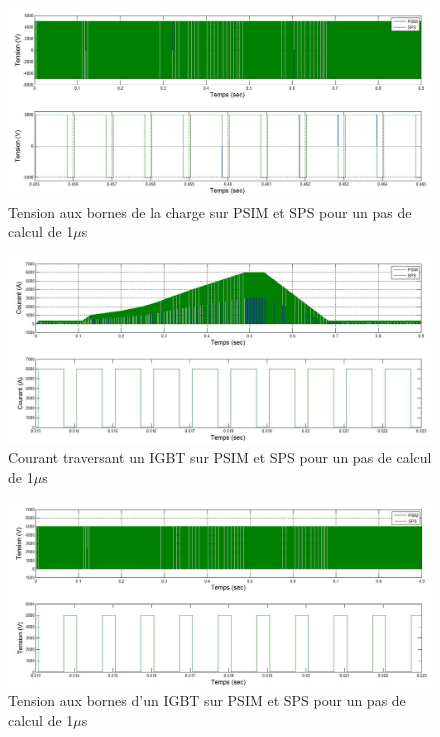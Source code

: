 \documentclass[11pt,letterpaper,final]{report}
\begin{document}
\begin{figure}[htb]
\centering
\includegraphics[scale=0.5]{Fig/Hacheur4Quadrants/HacheurTensionCharge1u.jpg}
\caption{Tension aux bornes de la charge sur PSIM et SPS pour un pas de calcul de 1$\mu$s}
\label{hc_ten_ch_1}
\end{figure}


\begin{figure}[htb]
\centering
\includegraphics[scale=0.5]{Fig/Hacheur4Quadrants/HacheurCourantIGBT1u.jpg}
\caption{Courant traversant un IGBT sur PSIM et SPS pour un pas de calcul de 1$\mu$s}
\label{hc_IG_cou_1}
\end{figure}

\begin{figure}[htb]
\centering
\includegraphics[scale=0.5]{Fig/Hacheur4Quadrants/HacheurTensionIGBT1u.jpg}
\caption{Tension aux bornes d'un IGBT sur PSIM et SPS pour un pas de calcul de 1$\mu$s}
\label{hc_IG_ten_1}
\end{figure}
\end{document}
